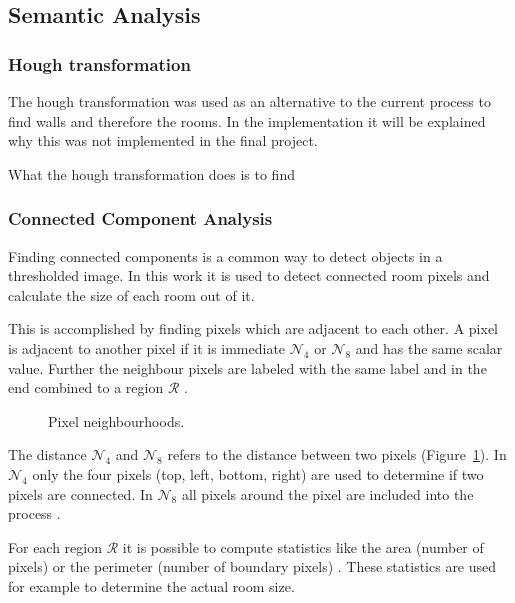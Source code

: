  
\subsection{Semantic Analysis}
\subsubsection{Hough transformation}
\label{subsubsec:Hough transformation}
The hough transformation was used as an alternative to the current process to find walls and therefore the rooms. In the implementation it will be explained why this was not implemented in the final project.

What the hough transformation does is to find 

\pagebreak

\subsubsection{Connected Component Analysis}
Finding connected components is a common way to detect objects in a thresholded image. In this work it is used to detect connected room pixels and calculate the size of each room out of it.

This is accomplished by finding pixels which are adjacent to each other. A pixel is adjacent to another pixel if it is immediate $\mathcal{N}_4$ or $\mathcal{N}_8$ and has the same scalar value. Further the neighbour pixels are labeled with the same label and in the end combined to a region $\mathcal{R}$ \citep[Section 3.3.4]{szeliski_2011}.

\begin{figure}[h]
	\centering
	\hfill
	\caption{Pixel neighbourhoods.}
	\label{fig:pixel_neighbourhood}
\end{figure}

The distance $\mathcal{N}_4$ and $\mathcal{N}_8$ refers to the distance between two pixels (Figure~\ref{fig:pixel_neighbourhood}). In $\mathcal{N}_4$ only the four pixels (top, left, bottom, right) are used to determine if two pixels are connected. In $\mathcal{N}_8$ all pixels around the pixel are included into the process \citep{burger_burge_2016}.

For each region $\mathcal{R}$ it is possible to compute statistics like the area (number of pixels) or the perimeter (number of boundary pixels) \citep[Section 3.3.4]{szeliski_2011}. These statistics are used for example to determine the actual room size.

